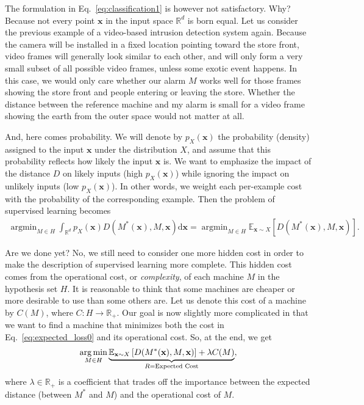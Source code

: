 \documentclass{report}
\newcommand{\vect}[1]{\mathbf{#1}}
\newcommand{\vx}[0]{\vect{x}}
\DeclareMathOperator*{\argmin}{\arg \min}
\begin{document}
The formulation in Eq.~\eqref{eq:classification1} is however not satisfactory.
Why? Because not every point $\vx$ in the input space $\mathbb{R}^d$ is born
equal. Let us consider the previous example of a video-based intrusion detection
system again. Because the camera will be installed in a fixed location pointing toward
the store front, video frames will generally look similar to each other, and
will only form a very small subset of all possible video frames, unless some
exotic event happens. In this case, we would only care whether our alarm $M$
works well for those frames showing the store front and people entering or
leaving the store. Whether the distance between the reference machine and my
alarm is small for a video frame showing the earth from the outer space would
not matter at all.

And, here comes probability. We will denote by $p_X(\vx)$ the probability
(density) assigned to the input $\vx$ under the distribution $X$, and assume
that this probability reflects how likely the input $\vx$ is. We want to
emphasize the impact of the distance $D$ on likely inputs (high $p_X(\vx)$)
while ignoring the impact on unlikely inputs (low $p_X(\vx)$). In other words,
we weight each per-example cost with the probability of the corresponding
example. Then the problem of supervised learning becomes 
\begin{align}
    \label{eq:expected_loss0}
    \argmin_{M\in H} \int_{\mathbb{R}^d} p_X(\vx) D(M^*(\vx), M, \vx) \text{d}\vx 
    = \argmin_{M \in H} \mathbb{E}_{\vx \sim X} \left[ D(M^*(\vx),  M, \vx)
    \right].
\end{align}

Are we done yet? No, we still need to consider one more hidden cost in order to
make the description of supervised learning more complete. This hidden cost
comes from the operational cost, or {\it complexity}, of each machine $M$ in the
hypothesis set $H$.  It is reasonable to think that some machines are cheaper or
more desirable to use than some others are. Let us denote this cost of a machine
by $C(M)$, where $C: H \to \mathbb{R}_+$. Our goal is now slightly more
complicated in that we want to find a machine that minimizes both the cost in
Eq.~\eqref{eq:expected_loss0} and its operational cost. So, at the end, we get
\begin{align}
    \label{eq:expected_loss1}
    \argmin_{M \in H} \underbrace{\mathbb{E}_{\vx \sim X} \left[ D(M^*(\vx), M, \vx) \right]
        + \lambda C(M)
    }_{
        \mathclap{R = \text{Expected Cost}}
    },
\end{align}
where $\lambda \in \mathbb{R}_+$ is a coefficient that trades off the importance
between the expected distance (between $M^*$ and $M$) and the operational cost
of $M$.
\end{document}
